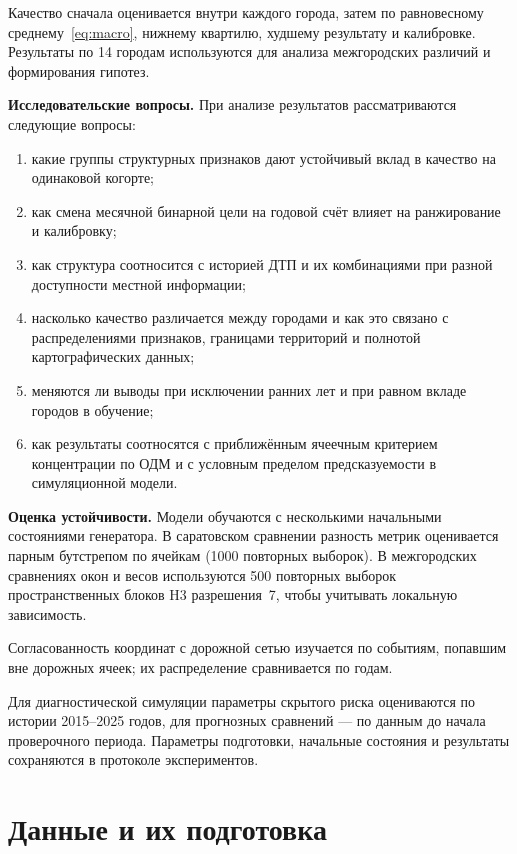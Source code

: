 \documentclass[coursework]{SCWorks}
\begin{document}
Качество сначала оценивается внутри каждого города, затем по
равновесному среднему~\eqref{eq:macro}, нижнему квартилю, худшему
результату и калибровке. Результаты по 14 городам используются
для анализа межгородских различий и формирования гипотез.

\textbf{Исследовательские вопросы.} При анализе результатов
рассматриваются следующие вопросы:
\begin{enumerate}
  \item какие группы структурных признаков дают устойчивый вклад
        в качество на одинаковой когорте;
  \item как смена месячной бинарной цели на годовой счёт влияет
        на ранжирование и калибровку;
  \item как структура соотносится с историей ДТП и их комбинациями
        при разной доступности местной информации;
  \item насколько качество различается между городами и как это
        связано с распределениями признаков, границами территорий
        и полнотой картографических данных;
  \item меняются ли выводы при исключении ранних лет и при равном
        вкладе городов в обучение;
  \item как результаты соотносятся с приближённым ячеечным критерием
        концентрации по ОДМ и с условным пределом предсказуемости
        в симуляционной модели.
\end{enumerate}

\textbf{Оценка устойчивости.} Модели обучаются с несколькими
начальными состояниями генератора. В саратовском сравнении
разность метрик оценивается парным бутстрепом по ячейкам
(1000 повторных выборок). В межгородских сравнениях окон и весов
используются 500 повторных выборок пространственных блоков
H3 разрешения~7, чтобы учитывать локальную зависимость.

Согласованность координат с дорожной сетью изучается по событиям,
попавшим вне дорожных ячеек; их распределение сравнивается по годам.

Для диагностической симуляции параметры скрытого риска оцениваются
по истории 2015--2025 годов, для прогнозных сравнений ---
по данным до начала проверочного периода.
Параметры подготовки, начальные состояния и результаты
сохраняются в протоколе экспериментов.

\section{Данные и их подготовка}
\end{document}
